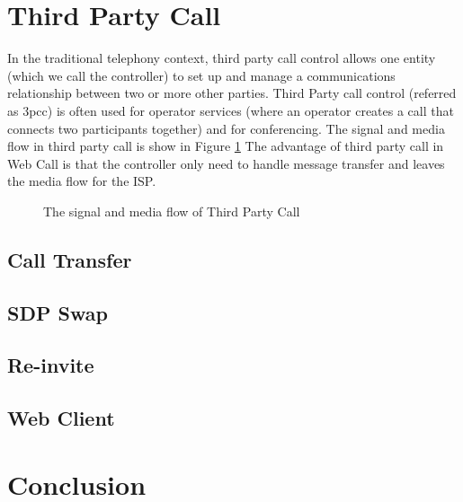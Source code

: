 \clearpage

\section{Third Party Call}
\label{sec:Solution:ThirdPartyCall}

In the traditional telephony context, third party call control allows one entity (which we call the controller) to set up and manage a communications relationship between two or more other parties. Third Party call control (referred as 3pcc) is often used for operator services (where an operator creates a call that connects two participants together) and for conferencing. The signal and media flow in third party call is show in Figure \ref{fig:TheSignalAndMediaFlowOf3pc} The advantage of third party call in Web Call is that the controller only need to handle message transfer and leaves the media flow for the ISP.

\begin{figure}[!hbtp]
\centering
{}
\caption{The signal and media flow of Third Party Call}
\label{fig:TheSignalAndMediaFlowOf3pc}
\end{figure}




\subsection{Call Transfer}
\label{sec:Solution:ThirdPartyCall:CallTransfer}


\subsection{SDP Swap}
\label{sec:Solution:ThirdPartyCall:SDPSwep}

\subsection{Re-invite}
\label{sec:Solution:ThirdPartyCall:Re-invite}

\subsection{Web Client}
\label{sec:Solution:ThirdPartyCall:WebClient}


\section{Conclusion}
\label{sec:Solution:Conclusion}




